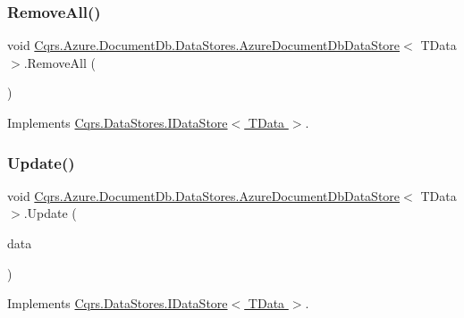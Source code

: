 \subsubsection{\texorpdfstring{Remove\+All()}{RemoveAll()}}
{\footnotesize\ttfamily void \hyperlink{classCqrs_1_1Azure_1_1DocumentDb_1_1DataStores_1_1AzureDocumentDbDataStore}{Cqrs.\+Azure.\+Document\+Db.\+Data\+Stores.\+Azure\+Document\+Db\+Data\+Store}$<$ T\+Data $>$.Remove\+All (\begin{DoxyParamCaption}{ }\end{DoxyParamCaption})}



Implements \hyperlink{interfaceCqrs_1_1DataStores_1_1IDataStore_aead8d7a39a717d29af05daf7b64bea94_aead8d7a39a717d29af05daf7b64bea94}{Cqrs.\+Data\+Stores.\+I\+Data\+Store$<$ T\+Data $>$}.

\mbox{\label{classCqrs_1_1Azure_1_1DocumentDb_1_1DataStores_1_1AzureDocumentDbDataStore_a55f504ed5094e3041a266b958424b1a2_a55f504ed5094e3041a266b958424b1a2}} 
\subsubsection{\texorpdfstring{Update()}{Update()}}
{\footnotesize\ttfamily void \hyperlink{classCqrs_1_1Azure_1_1DocumentDb_1_1DataStores_1_1AzureDocumentDbDataStore}{Cqrs.\+Azure.\+Document\+Db.\+Data\+Stores.\+Azure\+Document\+Db\+Data\+Store}$<$ T\+Data $>$.Update (\begin{DoxyParamCaption}\item[{T\+Data}]{data }\end{DoxyParamCaption})}



Implements \hyperlink{interfaceCqrs_1_1DataStores_1_1IDataStore_a6d5d4dd572de8db01ff0c48d37faefa7_a6d5d4dd572de8db01ff0c48d37faefa7}{Cqrs.\+Data\+Stores.\+I\+Data\+Store$<$ T\+Data $>$}.




